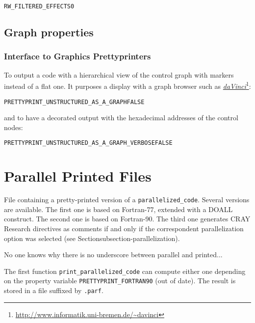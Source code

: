 \documentclass[a4paper]{report}
\newenvironment{PipsProp}{\begin{alltt}}{\end{alltt}}
\newcommand{\PdaVinci}{\LINK{\emph{daVinci}}{http://www.informatik.uni-bremen.de/~davinci}}
\newcommand{\LINK}[2]{\href{#2}{#1}\footnote{\url{#2}}\xspace}
\begin{document}
\begin{PipsProp}
RW_FILTERED_EFFECTS 0
\end{PipsProp}

\subsection{Graph properties}


\subsubsection{Interface to Graphics Prettyprinters}

To output a code with a hierarchical view of the control graph with
markers instead of a flat one. It purposes a display with a graph
browser such as \PdaVinci{}:

\begin{PipsProp}
PRETTYPRINT_UNSTRUCTURED_AS_A_GRAPH FALSE
\end{PipsProp}

and to have a decorated output with the hexadecimal addresses of the
control nodes:
\begin{PipsProp}
PRETTYPRINT_UNSTRUCTURED_AS_A_GRAPH_VERBOSE FALSE
\end{PipsProp}



\section{Parallel Printed Files}
\label{subsection-parallel-printed-files}

File containing a pretty-printed version of a
\verb+parallelized_code+. Several versions are available. The first one is
based on Fortran-77, extended with a DOALL construct. The second one is
based on Fortran-90. The third one generates CRAY Research directives as
comments if and only if the correspondent parallelization option was
selected (see Section{subsection-parallelization}).

No one knows why there is no underscore between parallel and printed...

The first function \verb+print_parallelized_code+ can compute either one
depending on the property variable \verb+PRETTYPRINT_FORTRAN90+ (out of
date). The result is stored in a file suffixed by \verb+.parf+.
\end{document}
